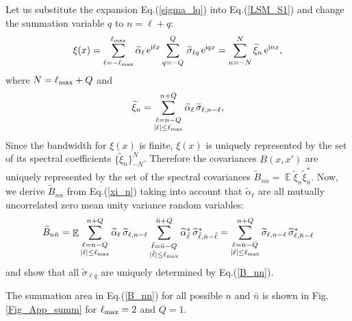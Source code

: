 \documentclass[12pt]{article}
\DeclareMathOperator{\Ex}{\mathbb{E}}
\newcommand{\e}{\mathrm{e}}
\renewcommand{\i}{\mathsf{i}}
\begin{document}
Let us substitute the expansion Eq.(\ref{sigma_lq}) into Eq.(\ref{LSM_S1}) and change the summation
variable $q$ to $n=\ell+q$:
%
\begin {equation}
\label{xi_ln}
\xi (x) =  \sum_{\ell=-\ell_{\rm max}}^{\ell_{\rm max}} \widetilde\alpha_{\ell} \, \e^{\i \ell x} 
           \sum_{q=-Q}^{Q} \,\widetilde\sigma_{\ell q} \, \e^{\i  q x}  =
   \sum_{n=-N}^{N}   \widetilde\xi_n \,\e^{\i n x},
\end {equation}
%
where $N=\ell_{\rm max}+Q$ and
%
\begin {equation}
\label{xi_n}
\widetilde\xi_n =   \sum_{\substack{\ell=n-Q \\ |\ell| \le \ell_{\rm max}}}^{n+Q} 
   \widetilde\alpha_{\ell} \,\widetilde\sigma_{\ell,n-\ell},
\end {equation}
%
Since the bandwidth for $\xi(x)$ is finite, 
$\xi(x)$ is uniquely represented by the set of its spectral coefficients $\{\widetilde\xi_n \}_{-N}^N$.
Therefore the covariances  $B(x,x')$ are uniquely represented by the set of the spectral covariances
$\widetilde B_{n \bar n} = \Ex \widetilde\xi_n \widetilde\xi_{\bar n}^*$.
Now, we derive $\widetilde B_{n \bar n}$ from Eq.(\ref{xi_n}) taking into account that 
$\widetilde\alpha_{\ell}$ are all mutually uncorrelated zero mean unity variance random variables:
%
\begin {equation}
\label{B_nn}
\widetilde B_{n \bar n} = \Ex  
  \sum_{\substack{\ell=n-Q \\ |\ell| \le \ell_{\rm max}}}^{n+Q} \widetilde\alpha_{\ell} \,\widetilde\sigma_{\ell,n-\ell} 
  \sum_{\substack{\bar\ell=\bar n-Q \\ |\bar\ell| \le \ell_{\rm max}}}^{\bar n+Q} \widetilde\alpha_{\bar\ell}^* \,\widetilde\sigma_{\bar\ell,\bar n-\bar\ell}^* =
 \sum_{\substack{\ell=n-Q \\ |\ell| \le \ell_{\rm max}}}^{n+Q} \widetilde\sigma_{\ell,n-\ell} \,\widetilde\sigma_{\ell,\bar n-\ell}^*
\end {equation}
%
and show that all $\widetilde\sigma_{\ell q}$
are uniquely determined by Eq.(\ref{B_nn}).

The summation area in Eq.(\ref{B_nn}) for all possible $n$ and $\bar n$ is 
shown in Fig.\ref{Fig_App_summ} for $\ell_{\rm max}=2$ and $Q=1$.
\end{document}
